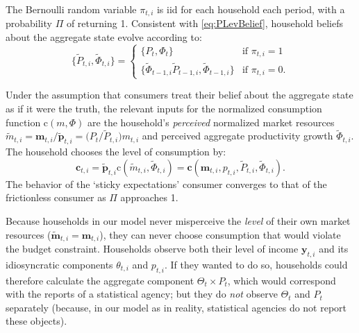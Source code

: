 \documentclass[titlepage]{./econtex}
\begin{document}
The Bernoulli random variable $\pi_{t,i}$ is iid for each household each period, with a probability $\Pi$ of returning 1.  Consistent with \eqref{eq:PLevBelief}, household beliefs about the aggregate state evolve according to:
\begin{equation}\label{eq:PLevBeliefSOE}
\{\widetilde{P}_{t,i},\widetilde{\Phi}_{t,i}\} = \begin{cases}
\{P_t, \Phi_t\} & \text{if } \pi_{t,i} = 1 \\
\{\widetilde{\Phi}_{t-1,i} \widetilde{P}_{t-1,i} , \widetilde{\Phi}_{t-1,i} \} & \text{if } \pi_{t,i} = 0.
\end{cases}
\end{equation}

Under the assumption that consumers treat their belief about the aggregate state as if it were the truth, the relevant inputs for the normalized consumption function $\mathrm{c}(m,\Phi)$ are the household's \textit{perceived} normalized market resources $\widetilde{m}_{t,i} = \mathbf{m}_{t,i}\big/\widetilde{\pmb{p}}_{t,i} = \big(P_t\big/\widetilde{P}_{t,i}\big)m_{t,i}$ and perceived aggregate productivity growth $\widetilde{\Phi}_{t,i}$.  The household chooses the level of consumption by:
\begin{equation*}
   \mathbf{c}_{t,i} = \widetilde{\pmb{p}}_{t,i} \mathrm{c}(\widetilde{m}_{t,i},\widetilde{\Phi}_{t,i}) = \textbf{c}(\mathbf{m}_{t,i}, p_{t,i}, \widetilde{P}_{t,i}, \widetilde{\Phi}_{t,i}). \label{eq:cPerc}
\end{equation*}
 The behavior of the `sticky expectations' consumer converges to that of the frictionless consumer as $\Pi$ approaches 1.

Because households in our model never misperceive the \textit{level} of their own market resources ($\widetilde{\mathbf{m}}_{t,i}=\mathbf{m}_{t,i}$), they can never choose consumption that would violate the budget constraint.  Households observe both their level of income $\mathbf{y}_{t,i}$ and its idiosyncratic components $\theta_{t,i}$ and ${p}_{t,i}$. If they wanted to do so, households could therefore calculate the aggregate component $\Theta_{t}\times {P}_{t}$, which would correspond with the reports of a statistical agency; but they do \textit{not} observe $\Theta_{t}$ and ${P}_{t}$ separately (because, in our model as in reality, statistical agencies do not report these objects).
\end{document}
